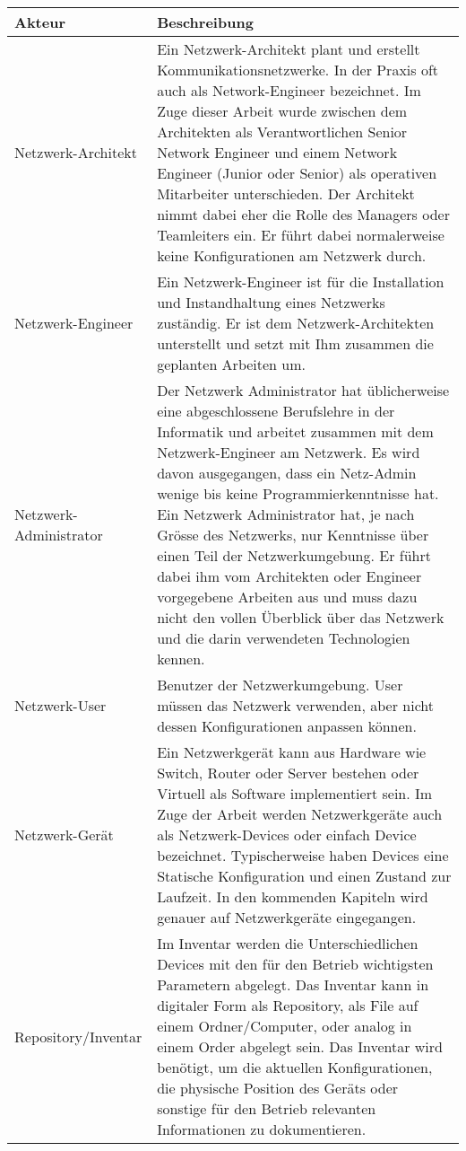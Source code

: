 \documentclass[
	ngerman,
	toc=listof, %
	toc=bibliography, %
	footnotes=multiple, %
	parskip=half, %
	numbers=noendperiod %
]{scrartcl}
\begin{document}
	\begin{tabularx}{\textwidth}{lX}
			\toprule
			Akteur &  Beschreibung \\
			\midrule
			Netzwerk-Architekt  & Ein Netzwerk-Architekt plant und erstellt Kommunikationsnetzwerke. 
			In der Praxis oft auch als Network-Engineer bezeichnet. 
			Im Zuge dieser Arbeit wurde zwischen dem Architekten als Verantwortlichen Senior Network Engineer und einem Network Engineer (Junior oder Senior) als operativen Mitarbeiter unterschieden. 
			Der Architekt nimmt dabei eher die Rolle des Managers oder Teamleiters ein. Er führt dabei normalerweise keine Konfigurationen am Netzwerk durch. \\ 
			Netzwerk-Engineer  & Ein Netzwerk-Engineer ist für die Installation und Instandhaltung eines Netzwerks zuständig. 
			Er ist dem Netzwerk-Architekten unterstellt und setzt mit Ihm zusammen die geplanten Arbeiten um. \\
			Netzwerk-Administrator  & Der Netzwerk Administrator hat üblicherweise eine abgeschlossene Berufslehre in der Informatik und arbeitet zusammen mit dem Netzwerk-Engineer am Netzwerk. 
			Es wird davon ausgegangen, dass ein Netz-Admin wenige bis keine Programmierkenntnisse hat. 
			Ein Netzwerk Administrator hat, je nach Grösse des Netzwerks, nur Kenntnisse über einen Teil der Netzwerkumgebung. 
			Er führt dabei ihm vom Architekten oder Engineer vorgegebene Arbeiten aus und muss dazu nicht den vollen Überblick über das Netzwerk und die darin verwendeten Technologien kennen.\\
			Netzwerk-User & Benutzer der Netzwerkumgebung. User müssen das Netzwerk verwenden, aber nicht dessen Konfigurationen anpassen können. \\
			\midrule
			Netzwerk-Gerät  & Ein Netzwerkgerät kann aus Hardware wie Switch, Router oder Server bestehen oder Virtuell als Software implementiert sein. Im Zuge der Arbeit werden Netzwerkgeräte auch als Netzwerk-Devices oder einfach Device bezeichnet. Typischerweise haben Devices eine Statische Konfiguration und einen Zustand zur Laufzeit. In den kommenden Kapiteln wird genauer auf Netzwerkgeräte eingegangen. \\
			Repository/Inventar &  Im Inventar werden die Unterschiedlichen Devices mit den für den Betrieb wichtigsten Parametern abgelegt. Das Inventar kann in digitaler Form als Repository, als File auf einem Ordner/Computer, oder analog in einem Order abgelegt sein. Das Inventar wird benötigt, um die aktuellen Konfigurationen, die physische Position des Geräts oder sonstige für den Betrieb relevanten Informationen zu dokumentieren. \\
			\bottomrule
		\end{tabularx}
		\newpage
\end{document}
